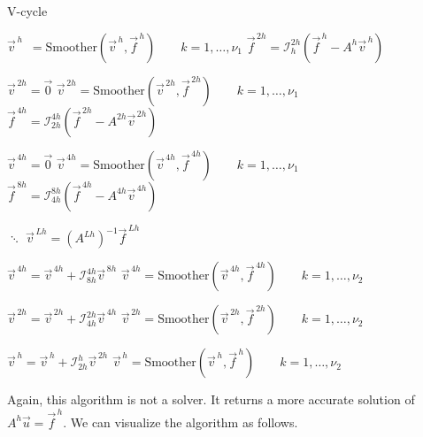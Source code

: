 \begin{algorithm}
    \caption{V-cycle}
    \begin{algorithmic} 
      \STATE $\vec{v}^{\,h} \enspace = \text{Smoother}(\vec{v}^{\,h}, \vec{f}^{\,h}) \qquad k=1, \ldots, \nu_1$ 
      \STATE $\vec{f}^{\,2h} = \mathcal{I}_{h}^{2h}(\vec{f}^{\,h} - A^h\vec{v}^{\,h})$

      \STATE \qquad $\vec{v}^{\,2h} = \vec{0}$ 
      \STATE \qquad $\vec{v}^{\,2h} = \text{Smoother}(\vec{v}^{\,2h}, \vec{f}^{\,2h}) \qquad k=1, \ldots, \nu_1$ 
      \STATE \qquad $\vec{f}^{\,4h} = \mathcal{I}_{2h}^{4h}(\vec{f}^{\,2h} - A^{2h}\vec{v}^{\,2h})$

      \STATE \qquad\qquad $\vec{v}^{\,4h} = \vec{0}$ 
      \STATE \qquad\qquad $\vec{v}^{\,4h} = \text{Smoother}(\vec{v}^{\,4h}, \vec{f}^{\,4h}) \qquad k=1, \ldots, \nu_1$ 
      \STATE \qquad\qquad $\vec{f}^{\,8h} = \mathcal{I}_{4h}^{8h}(\vec{f}^{\,4h} - A^{4h}\vec{v}^{\,4h})$

      \STATE \qquad\qquad\qquad $\ddots$
      \STATE \qquad\qquad\qquad\quad $\vec{v}^{\,Lh}=\left( A^{Lh} \right)^{-1}\vec{f}^{\,Lh}$
      \STATE \qquad\qquad\qquad {}

      \STATE \qquad\qquad $\vec{v}^{\,4h}  = \vec{v}^{\,4h} + \mathcal{I}_{8h}^{4h}\vec{v}^{\,8h}$
      \STATE \qquad\qquad $\vec{v}^{\,4h} = \text{Smoother}(\vec{v}^{\,4h}, \vec{f}^{\,4h}) \qquad k=1, \ldots, \nu_2$ 

      \STATE \qquad $\vec{v}^{\,2h}  = \vec{v}^{\,2h} + \mathcal{I}_{4h}^{2h}\vec{v}^{\,4h}$
      \STATE \qquad $\vec{v}^{\,2h} = \text{Smoother}(\vec{v}^{\,2h}, \vec{f}^{\,2h}) \qquad k=1, \ldots, \nu_2$ 

      \STATE $\vec{v}^{\,h}  = \vec{v}^{\,h} + \mathcal{I}_{2h}^{h}\vec{v}^{\,2h}$
      \STATE $\vec{v}^{\,h} = \text{Smoother}(\vec{v}^{\,h}, \vec{f}^{\,h}) \qquad k=1, \ldots, \nu_2$ 
    \end{algorithmic} 
\end{algorithm}
Again, this algorithm is not a solver. It returns a more accurate solution
of$A^h\vec{u} = \vec{f}^{\,h}$. We can visualize the algorithm as follows. 


